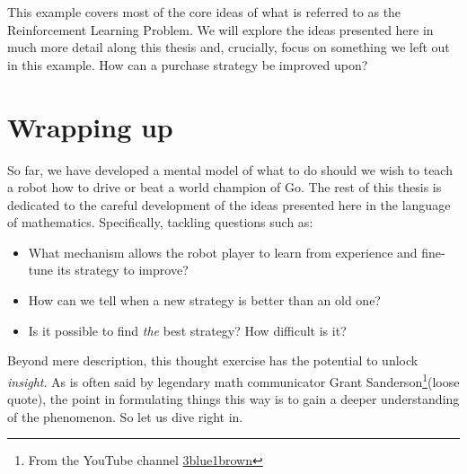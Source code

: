This example covers most of the core ideas of what is referred to as the
Reinforcement Learning Problem. We will explore the ideas presented here in much
more detail along this thesis and, crucially, focus on something we left out in
this example. How can a purchase strategy be improved upon?

\section{Wrapping up}
So far, we have developed a mental model of what to do should we wish to teach a
robot how to drive or beat a world champion of Go. The rest of this thesis is
dedicated to the careful development of the ideas presented here in the language
of mathematics. Specifically, tackling questions such as:
\begin{itemize}
	\item What mechanism allows the robot player to learn from experience and fine-tune its strategy to improve?
	\item How can we tell when a new strategy is better than an 
	old one?
	\item Is it possible to find \textit{the} best strategy? 
	How difficult is it?
\end{itemize}

Beyond mere description, this thought exercise has the potential to unlock
\textit{insight}. As is often said by legendary math communicator Grant
Sanderson\footnote{From the YouTube channel
\href{https://www.youtube.com/channel/UCYO_jab_esuFRV4b17AJtAw}{3blue1brown}}(loose
quote), the point in formulating things this way is to gain a deeper
understanding of the phenomenon. So let us dive right in.